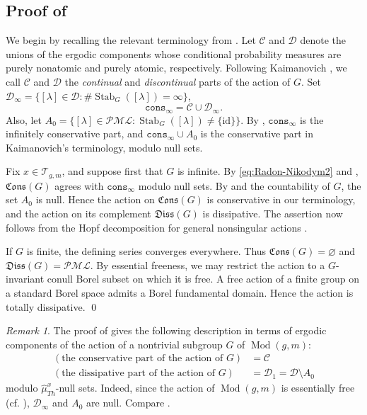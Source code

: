 \documentclass[dvipdfmx]{amsart}
\theoremstyle{remark}
\newtheorem{remark}{Remark}[section]
\newcommand{\teich}{\mathcal{T}}
\newcommand{\tmod}{\operatorname{Mod}}
\newcommand{\PThursM}{\hat{\mu}_{Th}}
\newcommand{\pml}{\mathcal{PML}}
\newcommand{\conservativepart}{\mathfrak{Cons}}
\newcommand{\dissipativepart}{\mathfrak{Diss}}
\begin{document}
\subsection{Proof of }
\label{subsec:ProofOfDecomposition}
We begin by recalling the relevant terminology from \cite{Kaimanovich2010}.
Let $\mathscr{C}$ and $\mathscr{D}$ denote the unions of the
ergodic components whose conditional probability measures are
purely nonatomic and purely atomic, respectively. Following Kaimanovich \cite{Kaimanovich2010}, we call $\mathscr{C}$ and $\mathscr{D}$ the \emph{continual} and \emph{discontinual} parts of the action of $G$.
Set
$\mathscr{D}_{\infty}=\{[\lambda]\in\mathscr{D}:\#\operatorname{Stab}_G([\lambda])=\infty\}$,
\[
\mathtt{cons}_{\infty}
=
\mathscr{C}\cup\mathscr{D}_{\infty}.
\]
Also, let
$A_0=
\{[\lambda]\in\pml:
\operatorname{Stab}_G([\lambda])\ne\{\mathrm{id}\}\}$.
By \cite[Theorem~14 and Corollary~15]{Kaimanovich2010},
$\mathtt{cons}_{\infty}$ is the infinitely conservative part,
and $\mathtt{cons}_{\infty}\cup A_0$ is the conservative part
in Kaimanovich's terminology, modulo null sets.

Fix $x\in\teich_{g,m}$, and suppose first that $G$ is infinite.
By \eqref{eq:Radon-Nikodym2} and
\cite[Theorem~29]{Kaimanovich2010},
$\conservativepart(G)$ agrees with
$\mathtt{cons}_{\infty}$ modulo null sets.
By  and the countability of $G$, the set
$A_0$ is null. Hence the action on $\conservativepart(G)$
is conservative in our terminology, and the action on its
complement $\dissipativepart(G)$ is dissipative.
The assertion now follows from the Hopf decomposition for general nonsingular actions
\cite[Theorem~14 and Corollary~15]{Kaimanovich2010}.

If $G$ is finite, the defining series converges everywhere.
Thus $\conservativepart(G)=\varnothing$ and $\dissipativepart(G)=\pml$.
By essential freeness, we may restrict the action to a $G$-invariant conull Borel subset on which it is free. A free action of a finite group on a standard Borel space admits a Borel fundamental domain. Hence the action is totally dissipative.
\qed

\begin{remark}
The proof of  gives the following description in terms of ergodic components of the action of a nontrivial subgroup $G$ of $\tmod(g,m)$:
\begin{align*}
(\text{the conservative part of the action of $G$})&=\mathscr{C} \\
(\text{the dissipative part of the action of $G$})&= \mathscr{D}_1=\mathscr{D}\setminus A_0
\end{align*}
modulo $\PThursM^x$-null sets. Indeed, since the action of $\tmod(g,m)$ is essentially free (cf. ), $\mathscr{D}_\infty$ and $A_0$ are null. Compare \cite[Corollary 16]{Kaimanovich2010}.
\end{remark}
\end{document}
